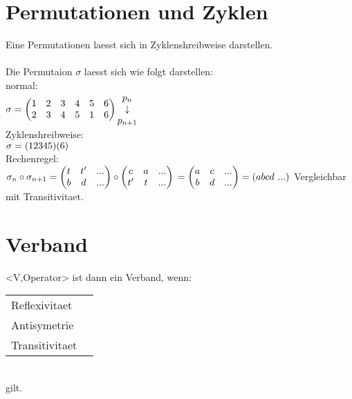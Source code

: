 \documentclass{article}
\begin{document}
\section{Permutationen und Zyklen}
Eine Permutationen laesst sich in Zyklenshreibweise darstellen.\\
\\
Die Permutaion $\sigma$ laesst sich wie folgt darstellen:\\
normal:\\
$
\sigma = \begin{pmatrix}
        1&2&3&4&5&6\\
        2&3&4&5&1&6\\
\end{pmatrix}
\begin{matrix}
        p_n\\
        \downarrow\\
        p_{n+1}\\
\end{matrix}\\
$
\\
Zyklenshreibweise:\\
$
\sigma = (12345)(6)\\
$
\\
Rechenregel:\\
$
    \sigma_n \circ \sigma_{n+1} 
=   \begin{pmatrix}
        t & t'  & ...\\
        b & d   & ...\\
\end{pmatrix} \circ \begin{pmatrix}
        c & a   & ...\\
        t' & t  & ...\\
\end{pmatrix}\\
=   \begin{pmatrix}
        a & c   & ...\\
        b & d   & ...\\
\end{pmatrix} = (abcd\ ...)\\
$
Vergleichbar mit Transitivitaet.\\
\section{Verband}
<V,Operator> ist dann ein Verband, wenn:\\
\begin{tabular}{ll}
        Reflexivitaet   &\\
        Antisymetrie    &\\
        Transitivitaet  &\\
\end{tabular}\\
gilt.\\
\\
\end{document}
